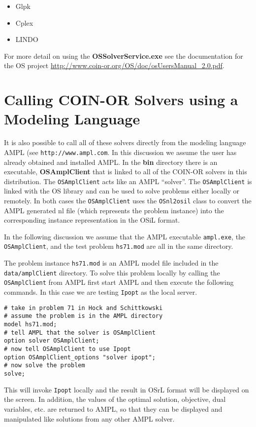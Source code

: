 \documentclass[11pt]{article}
\renewcommand{\_}{{\char"5F}}
\renewcommand{\{}{{\char"7B}}
\renewcommand{\}}{{\char"7D}}
\renewcommand{\^}{{\char"0D}}
\renewcommand{\'}{{\char"0D}}
\begin{document}
\begin{itemize}

 \item Glpk 

 \item Cplex 

 \item LINDO

\end{itemize}


For more detail on using the {\bf OSSolverService.exe} see the documentation for the OS project 
\url{http://www.coin-or.org/OS/doc/osUsersManual_2.0.pdf}.

\section{Calling COIN-OR  Solvers using a Modeling Language}\label{section:modellanguage}

It is also possible to call all of these solvers directly from the modeling language AMPL 
(see {\tt http://www.ampl.com}.  In this discussion we assume the user has already obtained and 
installed AMPL.  In the {\bf bin} directory there is an executable, {\bf OSAmplClient} 
that is linked to all of the COIN-OR solvers in this distribution.   The {\tt OSAmplClient} acts 
like an AMPL ``solver''. The {\tt OSAmplClient} is linked with the OS library and can be used 
to solve problems either locally or remotely. In both cases the {\tt OSAmplClient} uses the
{\tt OSnl2osil} class to convert the AMPL generated nl 
file (which represents the problem instance) into the corresponding 
instance representation in the OSiL format.

In the following discussion we assume that the AMPL executable {\tt ampl.exe}, the {\tt OSAmplClient}, 
and the test problem {\tt hs71.mod} are all in the same directory.  

The  problem instance {\tt hs71.mod} is an AMPL model file included in the {\tt data/amplClient} directory.
To solve this problem locally by calling the {\tt OSAmplClient} from AMPL first start AMPL and then
execute the following commands. In this case we are testing  {\tt Ipopt} as the
local server.

\begin{verbatim}
# take in problem 71 in Hock and Schittkowski
# assume the problem is in the AMPL directory
model hs71.mod;
# tell AMPL that the solver is OSAmplClient
option solver OSAmplClient;
# now tell OSAmplClient to use Ipopt
option OSAmplClient_options "solver ipopt";
# now solve the problem
solve;
\end{verbatim}
This will invoke {\tt Ipopt} locally and the result in OSrL format will be displayed on the screen.
In addition, the values of the optimal solution, objective, dual variables, etc. are returned to
AMPL, so that they can be displayed and manipulated like solutions from any other AMPL solver.
\end{document}
